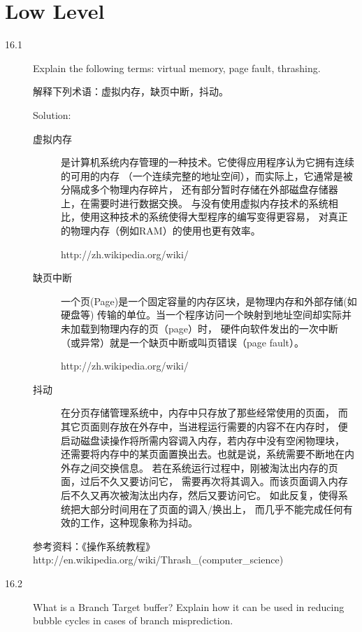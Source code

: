 \chapter{Low Level}

\begin{description}
\item[16.1] Explain the following terms: virtual memory, page fault, thrashing.

解释下列术语：虚拟内存，缺页中断，抖动。

Solution: 
\begin{description}
\item[虚拟内存] 是计算机系统内存管理的一种技术。它使得应用程序认为它拥有连续的可用的内存 （一个连续完整的地址空间），而实际上，它通常是被分隔成多个物理内存碎片， 还有部分暂时存储在外部磁盘存储器上，在需要时进行数据交换。 与没有使用虚拟内存技术的系统相比，使用这种技术的系统使得大型程序的编写变得更容易， 对真正的物理内存（例如RAM）的使用也更有效率。

http://zh.wikipedia.org/wiki/%

\item[缺页中断] 一个页(Page)是一个固定容量的内存区块，是物理内存和外部存储(如硬盘等) 传输的单位。当一个程序访问一个映射到地址空间却实际并未加载到物理内存的页（page）时， 硬件向软件发出的一次中断（或异常）就是一个缺页中断或叫页错误（page fault）。

http://zh.wikipedia.org/wiki/%

\item[抖动] 在分页存储管理系统中，内存中只存放了那些经常使用的页面， 而其它页面则存放在外存中，当进程运行需要的内容不在内存时， 便启动磁盘读操作将所需内容调入内存，若内存中没有空闲物理块， 还需要将内存中的某页面置换出去。也就是说，系统需要不断地在内外存之间交换信息。 若在系统运行过程中，刚被淘汰出内存的页面，过后不久又要访问它， 需要再次将其调入。而该页面调入内存后不久又再次被淘汰出内存，然后又要访问它。 如此反复，使得系统把大部分时间用在了页面的调入/换出上， 而几乎不能完成任何有效的工作，这种现象称为抖动。
\end{description}
参考资料：《操作系统教程》 http://en.wikipedia.org/wiki/Thrash\_(computer\_science)
%


\item[16.2] What is a Branch Target buffer? Explain how it can be used in reducing bubble cycles in cases of branch misprediction.	
%



\end{description}
